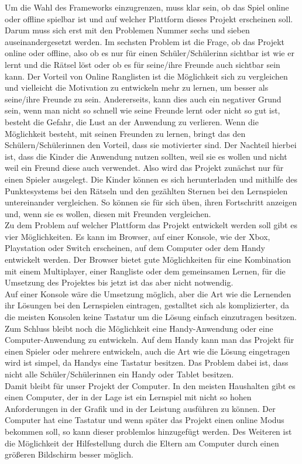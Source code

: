 Um die Wahl des Frameworks einzugrenzen, muss klar sein, ob das Spiel online oder offline spielbar ist und auf welcher Plattform dieses Projekt erscheinen soll.\\
Darum muss sich erst mit den Problemen Nummer sechs und sieben auseinandergesetzt werden.
Im sechsten Problem ist die Frage, ob das Projekt online oder offline, also ob es nur für einen Schüler/Schülerinn sichtbar ist wie er lernt und die Rätsel löst oder ob es für seine/ihre Freunde auch sichtbar sein kann. Der Vorteil von Online Ranglisten ist die Möglichkeit sich zu vergleichen und vielleicht die Motivation zu entwickeln mehr zu lernen, um besser als seine/ihre Freunde zu sein. Andererseits, kann dies auch ein negativer Grund sein, wenn man  nicht so schnell wie seine Freunde lernt oder nicht so gut ist, besteht die Gefahr, die Lust an der Anwendung zu verlieren. Wenn die Möglichkeit besteht, mit seinen Freunden zu lernen, bringt das den Schülern/Schülerinnen den Vorteil, dass sie motivierter sind. Der Nachteil hierbei ist, dass die Kinder die Anwendung nutzen sollten, weil sie es wollen und nicht weil ein Freund diese auch verwendet. Also wird das Projekt zunächst nur für einen Spieler ausgelegt. Die Kinder können es sich herunterladen und mithilfe des Punktesystems bei den Rätseln und den gezählten Sternen bei den Lernspielen untereinander vergleichen. So können sie für sich üben, ihren Fortschritt anzeigen und, wenn sie es wollen, diesen mit Freunden vergleichen.\\
Zu dem Problem auf welcher Plattform das Projekt entwickelt werden soll gibt es vier Möglichkeiten. Es kann im Browser, auf einer Konsole, wie der Xbox, Playstation oder Switch erscheinen, auf dem Computer oder dem Handy entwickelt werden. Der Browser bietet gute Möglichkeiten für eine Kombination mit einem Multiplayer, einer Rangliste oder dem  gemeinsamen Lernen, für die Umsetzung des Projektes bis jetzt ist das aber nicht notwendig.\\
Auf einer Konsole wäre die Umsetzung möglich, aber die Art wie die Lernenden ihr Lösungen bei den Lernspielen eintragen, gestalltet sich als komplizierter, da die meisten Konsolen keine Tastatur um die Lösung einfach einzutragen besitzen. Zum Schluss bleibt noch die Möglichkeit eine Handy-Anwendung oder eine Computer-Anwendung zu entwickeln. Auf dem Handy kann man das Projekt für einen Spieler oder mehrere entwickeln, auch die Art wie die Lösung eingetragen wird ist simpel, da Handys eine Tastatur besitzen. Das Problem dabei ist, dass nicht alle Schüler/Schülerinnen ein Handy oder Tablet besitzen.\\
Damit bleibt für unser Projekt der Computer. In den meisten Haushalten gibt es einen Computer, der in der Lage ist ein Lernspiel mit nicht so hohen Anforderungen in der Grafik und in der Leistung ausführen zu können. Der Computer hat eine Tastatur und wenn später das Projekt einen online Modus bekommen soll, so kann dieser problemlos hinzugefügt werden. Des Weiteren ist die Möglichkeit der Hilfestellung durch die Eltern am Computer durch einen größeren Bildschirm besser möglich.


